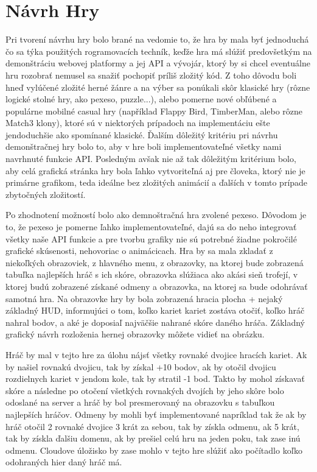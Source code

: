\section{Návrh Hry}
Pri tvorení návrhu hry bolo brané na vedomie to, že hra by mala byť jednoduchá čo sa týka použitých rogramovacích techník, keďže hra má slúžiť predovšetkým na demonštráciu webovej platformy a jej API a vývojár, ktorý by si chcel eventuálne hru rozobrať nemusel sa snažiť pochopiť príliš zložitý kód. Z toho dôvodu boli hneď vylúčené zložité herné žánre a na výber sa ponúkali skôr klasické hry (rôzne logické stolné hry, ako pexeso, puzzle...), alebo pomerne nové obľúbené a populárne mobilné casual hry (například Flappy Bird, TimberMan, alebo rôzne Match3 klony), ktoré sú v niektorých prípadoch na implementáciu ešte jendoduchšie ako spomínané klasické. Ďalším dôležitý kritériu pri návrhu demonštračnej hry bolo to, aby v hre boli implementovateľné všetky nami navrhnuté funkcie API. Posledným avšak nie až tak dôležitým kritérium bolo, aby celá grafická stránka hry bola ľahko vytvoriteľná aj pre človeka, ktorý nie je primárne grafikom, teda ideálne bez zložitých animácií a ďalších v tomto prípade zbytočných zložitostí. 

Po zhodnotení možností bolo ako demnoštračná hra zvolené pexeso. Dôvodom je to, že pexeso je pomerne ľahko implementovateľné, dajú sa do neho integrovať všetky naše API funkcie a pre tvorbu grafiky nie sú potrebné žiadne pokročilé grafické skúsenosti, nehovoriac o animácicach. Hra by sa mala zkladať z niekoľkých obrazoviek, z hlavného menu, z obrazovky, na ktorej bude zobrazená tabuľka najlepších hráč s ich skóre, obrazovka slúžiaca ako akási sieň trofejí, v ktorej budú zobrazené získané odmeny a obrazovka, na ktorej sa bude odohrávať samotná hra. Na obrazovke hry by bola zobrazená hracia plocha + nejaký základný HUD, informujúci o tom, koľko kariet kariet zostáva otočiť, koľko hráč nahral bodov, a aké je doposiaľ najväčšie nahrané skóre daného hráča. Základný grafický návrh rozloženia hernej obrazovky môžete vidieť na obrázku. 

Hráč by mal v tejto hre za úlohu nájsť všetky rovnaké dvojice hracích kariet. Ak by našiel rovnakú dvojicu, tak by získal +10 bodov, ak by otočil dvojicu rozdielnych kariet v jendom kole, tak by stratil -1 bod. Takto by mohol získavať skóre a následne po otočení všetkých rovnakých dvojích by jeho skôre bolo odoslané na server a hráč by bol presmerovaný na obrazovku s tabuľkou najlepších hráčov. Odmeny by mohli byť implementované napríklad tak že ak by hráč otočil 2 rovnaké dvojice 3 krát za sebou, tak by získla odmenu, ak 5 krát, tak by získla ďalšiu domenu, ak by prešiel celú hru na jeden poku, tak zase inú odmenu. Cloudove úložisko by zase mohlo v tejto hre slúžiť ako počítadlo koľko odohraných hier daný hráč má. 


